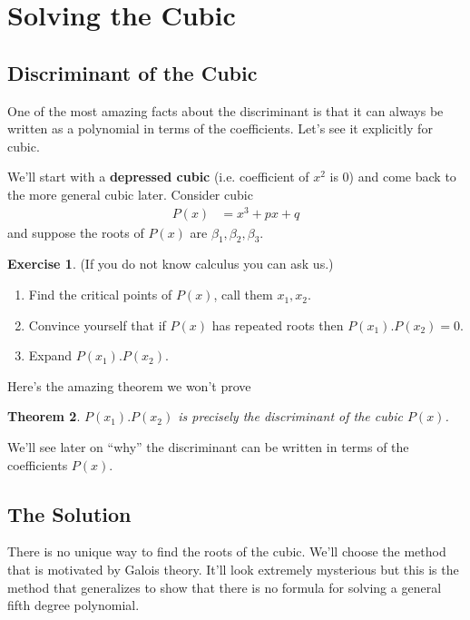\documentclass[reqno, 12pt, letter]{article}
\theoremstyle{plain}
\newtheorem{theorem}{Theorem}[section]
\theoremstyle{definition}
\newtheorem{exercise}[theorem]{Exercise}
\theoremstyle{remark}
\numberwithin{equation}{section}
\begin{document}
\newpage
\section{Solving the Cubic}

	
	
	
	
	
	\subsection{Discriminant of the Cubic}
	One of the most amazing facts about the discriminant is that it can always be written as a polynomial in terms of the coefficients. Let's see it explicitly for cubic.
	
	We'll start with a \textbf{depressed cubic} (i.e. coefficient of $ x^2$ is 0) and come back to the more general cubic later. Consider cubic
		\begin{align*}
			P(x) &= x^3 + px + q
		\end{align*}
	and suppose the roots of $ P(x)$ are $ \beta_1, \beta_2, \beta_3$.
	
	\begin{exercise}
		(If you do not know calculus you can ask us.)
		\begin{enumerate}
			\item Find the critical points of $ P(x)$, call them $ x_1, x_2$.
			\item Convince yourself that if $ P(x)$ has repeated roots then $ P(x_1).P(x_2) = 0$.
			\item Expand $ P(x_1).P(x_2)$.
		\end{enumerate}
	\end{exercise}
	Here's the amazing theorem we won't prove 
	\begin{theorem}
		$ P(x_1).P(x_2)$ is precisely the discriminant of the cubic $ P(x)$.
	\end{theorem}
	We'll see later on ``why'' the discriminant can be written in terms of the coefficients $ P(x)$.
	
	\subsection{The Solution}
		
		
	There is no unique way to find the roots of the cubic. 
	We'll choose the method that is motivated by Galois theory. 
	It'll look extremely mysterious but this is the method that generalizes to show that there is no formula for solving a general fifth degree polynomial. 
	
\end{document}
